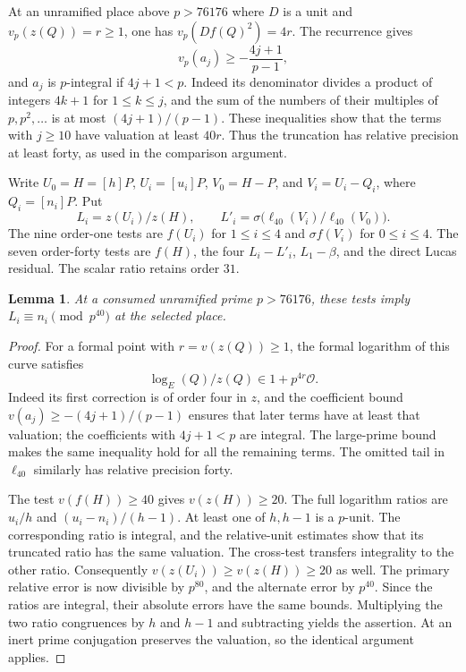\documentclass[11pt,a4paper]{article}
\newtheorem{lemma}[theorem]{Lemma}
\theoremstyle{definition}
\theoremstyle{remark}
\begin{document}
At an unramified place above $p>76176$ where $D$ is a unit and
$v_p(z(Q))=r\ge1$, one has $v_p(Df(Q)^2)=4r$.
The recurrence gives
\[
 v_p(a_j)\ge-\frac{4j+1}{p-1},
\]
and $a_j$ is $p$-integral if $4j+1<p$.
Indeed its denominator divides a product of integers $4k+1$ for
$1\le k\le j$, and the sum of the numbers of their multiples of
$p,p^2,\ldots$ is at most $(4j+1)/(p-1)$.
These inequalities show that the terms with $j\ge10$ have valuation
at least $40r$. Thus the truncation has relative precision at least
forty, as used in the comparison argument.

Write $U_0=H=[h]P$, $U_i=[u_i]P$, $V_0=H-P$, and
$V_i=U_i-Q_i$, where $Q_i=[n_i]P$. Put
\[
 L_i=z(U_i)/z(H),\qquad
 L'_i=\sigma\bigl(\ell_{40}(V_i)/\ell_{40}(V_0)\bigr).
\]
The nine order-one tests are $f(U_i)$ for $1\le i\le4$ and
$\sigma f(V_i)$ for $0\le i\le4$. The seven order-forty
tests are $f(H)$, the four $L_i-L'_i$, $L_1-\beta$, and
the direct Lucas residual. The scalar ratio retains order $31$.

\begin{lemma}\label{lem:asymmetric-soundness}
At a consumed unramified prime $p>76176$, these tests imply
$L_i\equiv n_i\pmod{p^{40}}$ at the selected place.
\end{lemma}
\begin{proof}
For a formal point with $r=v(z(Q))\ge1$, the formal logarithm
of this curve satisfies
\[
               \log_E(Q)/z(Q)\in1+p^{4r}\mathcal O.
\]
Indeed its first correction is of order four in $z$, and the
coefficient bound $v(a_j)\ge-(4j+1)/(p-1)$ ensures that later
terms have at least that valuation; the coefficients with
$4j+1<p$ are integral. The large-prime bound makes the same
inequality hold for all the remaining terms. The omitted tail
in $\ell_{40}$ similarly has relative precision forty.

The test $v(f(H))\ge40$ gives $v(z(H))\ge20$.
The full logarithm ratios are $u_i/h$ and
$(u_i-n_i)/(h-1)$. At least one of $h,h-1$ is a $p$-unit.
The corresponding ratio is integral, and the relative-unit
estimates show that its truncated ratio has the same valuation.
The cross-test transfers integrality to the other ratio.
Consequently $v(z(U_i))\ge v(z(H))\ge20$ as well.
The primary relative error is now divisible by $p^{80}$,
and the alternate error by $p^{40}$. Since the ratios are
integral, their absolute errors have the same bounds. Multiplying
the two ratio congruences by $h$ and $h-1$ and subtracting yields
the assertion. At an inert prime conjugation preserves the
valuation, so the identical argument applies.
\end{proof}
\end{document}
